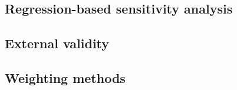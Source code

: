 \documentclass[12pt]{article}
\begin{document}
\subsection{Regression-based sensitivity analysis}





\subsection{External validity}

\begin{verse}  \end{verse}

\begin{verse}  \end{verse}

\begin{verse}  \end{verse}

\begin{verse}  \end{verse}

\begin{verse}  \end{verse}

\subsection{Weighting methods}

\begin{verse}  \end{verse}

\begin{verse}  \end{verse}

\begin{verse}  \end{verse}

\begin{verse}  \end{verse}

\begin{verse}  \end{verse}
\end{document}
